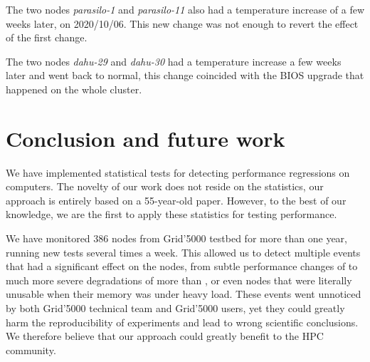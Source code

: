                 The two nodes \emph{parasilo-1} and \emph{parasilo-11} also had a temperature increase of
                 a few weeks later, on 2020/10/06. This new change was not enough to revert the effect
                of the first change.

                The two nodes \emph{dahu-29} and \emph{dahu-30} had a temperature increase a few weeks later and went
                back to normal, this change coincided with the BIOS upgrade that happened on the whole cluster.

    \section{Conclusion and future work}%
    \label{sec:test:conclusion}

        We have implemented statistical tests for detecting performance regressions on computers. The novelty of our
        work does not reside on the statistics, our approach is entirely based on a 55-year-old paper. However, to the
        best of our knowledge, we are the first to apply these statistics for testing performance.

        We have monitored 386 nodes from Grid'5000 testbed for more than one year, running new tests several times a
        week. This allowed us to detect multiple events that had a significant effect on the nodes, from subtle
        performance changes of  to much more severe degradations of more than , or
        even nodes that were literally unusable when their memory was under heavy load. These events went unnoticed by
        both Grid'5000 technical team and Grid'5000 users, yet they could greatly harm the reproducibility of
        experiments and lead to wrong scientific conclusions. We therefore believe that our approach could greatly
        benefit to the HPC community.

